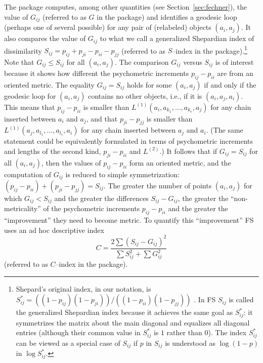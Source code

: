 \documentclass[nojss]{jss}
\begin{document}
The package  computes, among other quantities (see Section~\ref{sec:fechner}), the value of $G_{ij}$ 
(referred to as $G$ in the package) and identifies
a geodesic loop (perhaps one of several possible) for any pair of
(relabeled) objects $\left(a_{i},a_{j}\right)$. It also compares
the value of $G_{ij}$ to what we call a generalized Shepardian index of dissimilarity
$S_{ij}=p_{ij}+p_{ji}-p_{ii}-p_{jj}$ (referred to as $S$--index in the package).\footnote{Shepard's original index, 
in our notation, is $S_{ij}^{*}=\left(\left(1-p_{ij}\right)\left(1-p_{ji}\right)\right)/\left(\left(1-p_{ii}\right)\left(1-p_{jj}\right)\right)$
\citep[][]{Shepard1957, Shepard1987}. In FS $S_{ij}$ is called the generalized Shepardian index 
because it achieves the same goal as $S_{ij}^{*}$: it symmetrizes the matrix about the main diagonal and equalizes 
all diagonal entries (although their common value in $S_{ij}^{*}$ is $1$ rather than $0$).
The index $S_{ij}^{*}$ can be viewed as a special case of $S_{ij}$ if $p$ in $S_{ij}$ is understood as 
$\log\left(1-p\right)$ in $\log S_{ij}^{*}$.}
Note that $G_{ij}\leq S_{ij}$ for all $\left(a_{i},a_{j}\right)$. 
The comparison $G_{ij}$ versus $S_{ij}$ is of interest because it shows how different the psychometric increments 
$p_{ij}-p_{ii}$ are from an oriented metric.
The equality $G_{ij}=S_{ij}$ holds for some $\left(a_{i},a_{j}\right)$ if and only if the geodesic loop for
$\left(a_{i},a_{j}\right)$ contains no other objects, i.e., if it is $\left(a_{i},a_{j},a_{i}\right)$. 
This means that $p_{ij}-p_{ii}$ is smaller than $L^{(1)}\left(a_{i},a_{k_{1}},\ldots,a_{k_{r}},a_{j}\right)$
for any chain inserted between $a_{i}$ and $a_{j}$, and that $p_{ji}-p_{jj}$ is smaller than $L^{(1)}\left(a_{j},a_{l_{1}},\ldots,a_{l_{s}},a_{i}\right)$
for any chain inserted between $a_{j}$ and $a_{i}$. (The same statement could be equivalently formulated in terms of psychometric increments
and lengths of the second kind, $p_{ji}-p_{ii}$ and $L^{(2)}$.)
It follows that if $G_{ij}=S_{ij}$ for all $\left(a_{i},a_{j}\right)$, then the values of $p_{ij}-p_{ii}$ form an oriented metric, and the computation
of $G_{ij}$ is reduced to simple symmetrization: $\left(p_{ij}-p_{ii}\right)+\left(p_{ji}-p_{jj}\right)=S_{ij}$.
The greater the number of points $\left(a_{i},a_{j}\right)$ for which $G_{ij}<S_{ij}$ and the greater the differences $S_{ij}-G_{ij}$, 
the greater the ``non-metricality'' of the psychometric increments $p_{ij}-p_{ii}$ and the greater the ``improvement'' they need to become metric. 
To quantify this ``improvement'' FS uses an ad hoc descriptive index
\[
C=\frac{2\sum\left(S_{ij}-G_{ij}\right)^{2}}{\sum S_{ij}^{2}+\sum G_{ij}^{2}}
\]
(referred to as $C$--index in the package).
\end{document}
